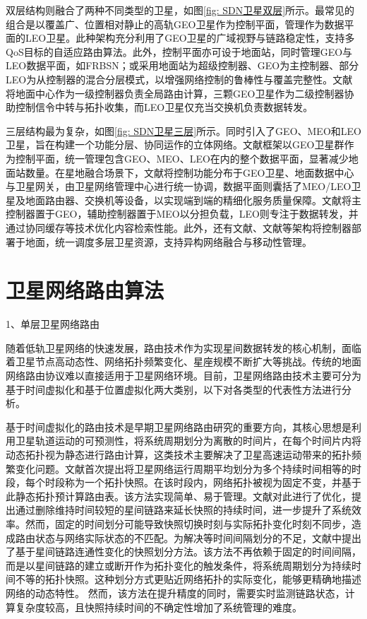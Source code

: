 \documentclass[print, master, vlined]{DissertUESTC}
\begin{document}
    双层结构则融合了两种不同类型的卫星，如图\ref{fig: SDN卫星双层}所示。最常见的组合是以覆盖广、位置相对静止的高轨GEO卫星作为控制平面，管理作为数据平面的LEO卫星。此种架构充分利用了GEO卫星的广域视野与链路稳定性，支持多QoS目标的自适应路由算法。此外，控制平面亦可设于地面站，同时管理GEO与LEO数据平面，如FRBSN；或采用地面站为超级控制器、GEO为主控制器、部分LEO为从控制器的混合分层模式，以增强网络控制的鲁棒性与覆盖完整性。文献\cite{1021025190.nh}将地面中心作为一级控制器负责全局路由计算，三颗GEO卫星作为二级控制器协助控制信令中转与拓扑收集，而LEO卫星仅充当交换机负责数据转发。
    
    三层结构最为复杂，如图\ref{fig: SDN卫星三层}所示。同时引入了GEO、MEO和LEO卫星，旨在构建一个功能分层、协同运作的立体网络。文献\cite{bao2014opensan}框架以GEO卫星群作为控制平面，统一管理包含GEO、MEO、LEO在内的整个数据平面，显著减少地面站数量。在星地融合场景下，文献\cite{li2017service}将控制功能分布于GEO卫星、地面数据中心与卫星网关，由卫星网络管理中心进行统一协调，数据平面则囊括了MEO/LEO卫星及地面路由器、交换机等设备，以实现端到端的精细化服务质量保障。文献\cite{li2019icn}将主控制器置于GEO，辅助控制器置于MEO以分担负载，LEO则专注于数据转发，并通过协同缓存等技术优化内容检索性能。此外，还有文献\cite{feng2014scheme}、文献\cite{feng2017hetnet}等架构将控制器部署于地面，统一调度多层卫星资源，支持异构网络融合与移动性管理。
    
    \section{卫星网络路由算法}
    1、单层卫星网络路由

    随着低轨卫星网络的快速发展，路由技术作为实现星间数据转发的核心机制，面临着卫星节点高动态性、网络拓扑频繁变化、星座规模不断扩大等挑战。传统的地面网络路由协议难以直接适用于卫星网络环境。目前，卫星网络路由技术主要可分为基于时间虚拟化和基于位置虚拟化两大类别，以下对各类型的代表性方法进行分析。
    
    基于时间虚拟化的路由技术是早期卫星网络路由研究的重要方向，其核心思想是利用卫星轨道运动的可预测性，将系统周期划分为离散的时间片，在每个时间片内将动态拓扑视为静态进行路由计算，这类技术主要解决了卫星高速运动带来的拓扑频繁变化问题。文献\cite{werner2002dynamic}首次提出将卫星网络运行周期平均划分为多个持续时间相等的时段，每个时段称为一个拓扑快照。在该时段内，网络拓扑被视为固定不变，并基于此静态拓扑预计算路由表。该方法实现简单、易于管理。文献\cite{王京林2009LEO}对此进行了优化，提出通过删除维持时间较短的星间链路来延长快照的持续时间，进一步提升了系统效率。然而，固定的时间划分可能导致快照切换时刻与实际拓扑变化时刻不同步，造成路由状态与网络实际状态的不匹配。为解决等时间间隔划分的不足，文献\cite{gounder1999routing}中提出了基于星间链路连通性变化的快照划分方法。该方法不再依赖于固定的时间间隔，而是以星间链路的建立或断开作为拓扑变化的触发条件，将系统周期划分为持续时间不等的拓扑快照。这种划分方式更贴近网络拓扑的实际变化，能够更精确地描述网络的动态特性。
    然而，该方法在提升精度的同时，需要实时监测链路状态，计算复杂度较高，且快照持续时间的不确定性增加了系统管理的难度。
    
\end{document}
